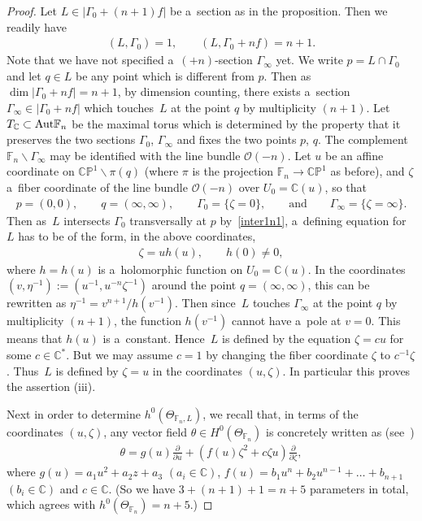 \documentclass[pdftex]{sigma}
\numberwithin{equation}{section}
\begin{document}
\begin{proof}
Let $L\in |\Gamma_0 +(n+1)f|$ be a~section as in the proposition.
Then we readily have
\begin{gather}
\label{inter1n1}
(L,\Gamma_0)=1,
\qquad
(L,\Gamma_0+nf) = n+1.
\end{gather}
Note that we have not specif\/ied a~$(+n)$-section $\Gamma_{\infty}$ yet.
We write $p=L\cap\Gamma_0$ and let $q\in L$ be any point which is dif\/ferent from $p$.
Then as $\dim |\Gamma_0+nf| = n+1$, by dimension counting, there exists a~section $\Gamma_{\infty} \in |\Gamma_0 + nf|$
which touches~$L$ at the point $q$ by multiplicity $(n+1)$.
Let $T_{\mathbb{C}}\subset{\rm{Aut}}\mathbb{F}_n$ be the maximal torus which is determined by the property that it
preserves the two sections $\Gamma_0$, $\Gamma_{\infty}$ and f\/ixes the two points $p$, $q$.
The complement $\mathbb{F}_n\backslash \Gamma_{\infty}$ may be identif\/ied with the line bundle $\mathscr O(-n)$.
Let $u$ be an af\/f\/ine coordinate on $\mathbb{CP}^1\backslash \pi(q)$ (where $\pi$ is the projection
$\mathbb{F}_n\to\mathbb{CP}^1$ as before), and $\zeta$ a~f\/iber coordinate of the line bundle $\mathscr O(-n)$ over
$U_0=\mathbb{C}(u)$, so that
\begin{gather*}
p=(0,0),
\qquad
q=(\infty,\infty),
\qquad
\Gamma_{0} = \{\zeta=0\},
\qquad
\text{and}
\qquad
\Gamma_{\infty} = \{\zeta=\infty\}.
\end{gather*}
Then as~$L$ intersects $\Gamma_0$ transversally at $p$ by~\eqref{inter1n1}, a~def\/ining equation for~$L$ has to be of
the form, in the above coordinates,
\begin{gather*}
\zeta = uh(u),
\qquad
h(0)\neq 0,
\end{gather*}
where $h=h(u)$ is a~holomorphic function on $U_0 = \mathbb{C}(u)$.
In the coordinates $(v,\eta^{-1}):= (u^{-1},u^{-n}\zeta^{-1})$ around the point $q=(\infty,\infty)$, this can be
rewritten as $ \eta^{-1} = v^{n+1}/h(v^{-1})$.
Then since~$L$ touches $\Gamma_{\infty}$ at the point $q$ by multiplicity $(n+1)$, the function $h(v^{-1})$ cannot have
a~pole at $v=0$.
This means that $h(u)$ is a~constant.
Hence~$L$ is def\/ined by the equation $\zeta = cu$ for some $c\in \mathbb{C}^*$.
But we may assume $c=1$ by changing the f\/iber coordinate $\zeta$ to $c^{-1}\zeta$.
Thus~$L$ is def\/ined by $\zeta=u$ in the coordinates $(u,\zeta)$.
In particular this proves the assertion (iii).

Next in order to determine $h^0(\Theta_{\mathbb{F}_n,L})$, we recall that, in terms of the coordinates $(u,\zeta)$, any
vector f\/ield $\theta\in H^0(\Theta_{\mathbb{F}_n})$ is concretely written as (see~\cite[pp. 43--44]{MKbook})
\begin{gather}
\label{MK1}
\theta= g(u) \frac{\partial}{\partial u} + \left( f(u) \zeta^ 2 + c\zeta u \right) \frac{\partial}{\partial \zeta},
\end{gather}
where $g(u) = a_1 u^2 + a_2 z + a_3$
$(a_i\in\mathbb{C})$,
$f(u) = b_1 u^n + b_2 u^{n-1} + \dots + b_{n+1}$
$(b_i\in\mathbb{C})$ and $c\in \mathbb{C}$.
(So we have $3 + (n+1) + 1 = n + 5$ parameters in total, which agrees with $h^0(\Theta_{\mathbb{F}_n}) = n+5$.)


\end{proof}
\end{document}
